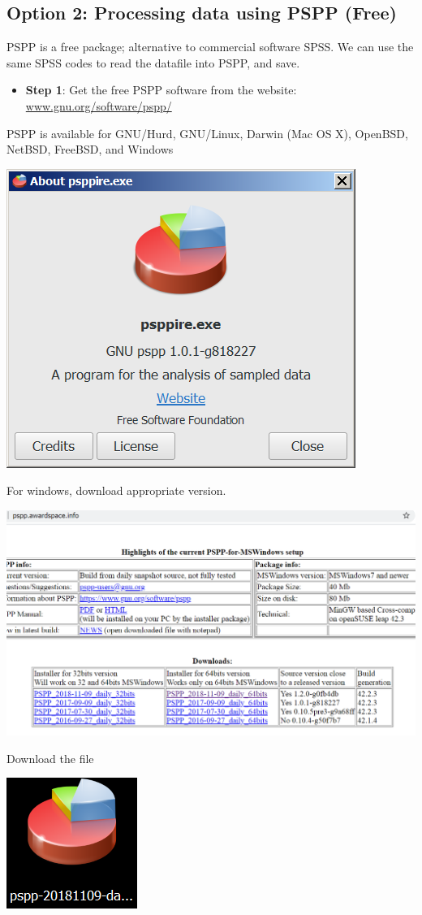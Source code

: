 \documentclass[
]{book}
\providecommand{\tightlist}{%
  \setlength{\itemsep}{0pt}\setlength{\parskip}{0pt}}
\begin{document}
\hypertarget{option-2-processing-data-using-pspp-free}{%
\subsection{Option 2: Processing data using PSPP (Free)}\label{option-2-processing-data-using-pspp-free}}

PSPP is a free package; alternative to commercial software SPSS. We can use the same SPSS codes to read the datafile into PSPP, and save.

\begin{itemize}
\tightlist
\item
  \textbf{Step 1}: Get the free PSPP software from the website: \href{http://www.gnu.org/software/pspp/}{www.gnu.org/software/pspp/}
\end{itemize}

PSPP is available for GNU/Hurd, GNU/Linux, Darwin (Mac OS X), OpenBSD, NetBSD, FreeBSD, and Windows

\includegraphics[width=0.65\linewidth]{images/abacus30}

For windows, download appropriate version.

\includegraphics[width=0.65\linewidth]{images/psppdownload0}

Download the file

\includegraphics[width=0.25\linewidth]{images/psppdownload}
\end{document}
